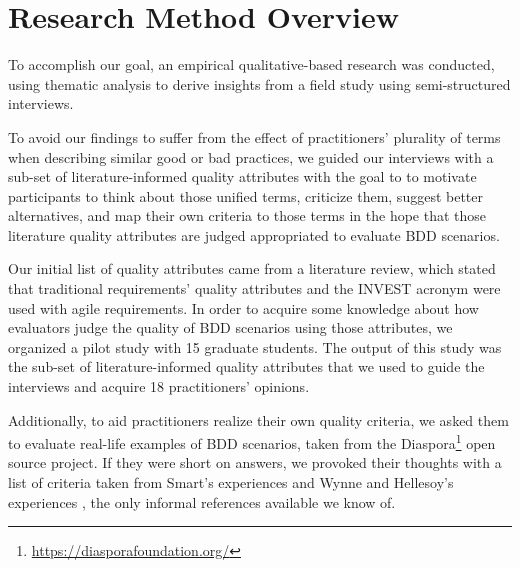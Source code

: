 
\section{Research Method Overview}

To accomplish our goal, an empirical qualitative-based research was conducted, using thematic analysis to derive insights from a field study using semi-structured interviews.

To avoid our findings to suffer from the effect of practitioners' plurality of terms when describing similar good or bad practices, we guided our interviews with a sub-set of literature-informed quality attributes with the goal to to motivate participants to think about those unified terms, criticize them, suggest better alternatives, and map their own criteria to those terms in the hope that those literature quality attributes are judged appropriated to evaluate BDD scenarios. 

Our initial list of quality attributes came from a literature review, which stated that traditional requirements' quality attributes \cite{Babok_2009}\cite{Babok_2015} and the INVEST\cite{Cohn_2004} acronym were used with agile requirements. In order to acquire some knowledge about how evaluators judge the quality of BDD scenarios using those attributes, we organized a pilot study with 15 graduate students. The output of this study \cite{Empire_2017} was the sub-set of literature-informed quality attributes that we used to guide the interviews and acquire 18 practitioners' opinions.

Additionally, to aid practitioners realize their own quality criteria, we asked them to evaluate real-life examples of BDD scenarios, taken from the Diaspora\footnote{\url{https://diasporafoundation.org/}} open source project. If they were short on answers, we provoked their thoughts with a list of criteria taken from Smart's experiences \cite{Smart_2014} and Wynne and Hellesoy's experiences \cite{Wynne_and_Hellesoy_2012}, the only informal references available we know of.

